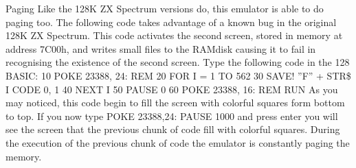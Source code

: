 Paging
Like the 128K ZX Spectrum versions do, this emulator is able to do paging too.
The following code takes advantage of a known bug in the original 128K ZX Spectrum. This code activates the second screen, stored in memory at address 7C00h, and writes small files to the RAMdisk causing it to fail in recognising the existence of the second screen. Type the following code in the 128 BASIC:
10 POKE 23388, 24: REM
20 FOR I = 1 TO 562
30 SAVE! ''F'' + STR\$ I CODE 0, 1
40 NEXT I
50 PAUSE 0
60 POKE 23388, 16: REM
RUN
As you may noticed, this code begin to fill the screen with colorful squares form bottom to top. If you now type POKE 23388,24: PAUSE 1000 and press enter you will see the screen that the previous chunk of code fill with colorful squares. During the execution of the previous chunk of code the emulator is constantly paging the memory.
